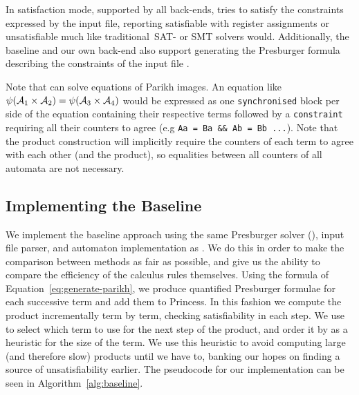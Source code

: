 \documentclass[acmsmall,review,anonymous]{acmart}\settopmatter{printfolios=true,printccs=false,printacmref=true}
\theoremstyle{definition}
\begin{document}
In satisfaction mode, supported by all back-ends, \Catra{} tries to satisfy the
constraints expressed by the input file, reporting satisfiable with register
assignments or unsatisfiable much like traditional~SAT- or SMT solvers would.
Additionally, the baseline and our own back-end also support generating
the Presburger formula describing the constraints of the input file .

Note that \Catra{} can solve equations of Parikh images. An equation like
$\operatorname{\psi}(\mathcal{A}_1 \times \mathcal{A}_2) = \operatorname{\psi}(\mathcal{A}_3 \times
\mathcal{A}_4)$ would be expressed as one \lstinline{synchronised} block per side of
the equation containing their respective terms followed by a
\lstinline{constraint} requiring all their counters to agree (e.g
\lstinline|Aa = Ba && Ab = Bb ...|). Note that the product construction will implicitly require the counters of each term to agree with each other (and the product), so equalities between all counters of all automata are not necessary.

\subsection{Implementing the Baseline}

We implement the baseline approach using the same Presburger solver
(\Princess{}), input file parser, and automaton implementation as \Catra{}. We
do this in order to make the comparison between methods as fair as possible, and
give us the ability to compare the efficiency of the calculus rules themselves.
Using the formula of Equation~\ref{eq:generate-parikh}, we produce quantified
Presburger formulae for each successive term and add them to Princess. In this
fashion we compute the product incrementally term by term, checking
satisfiability in each step. We use  to select which
term to use for the next step of the product, and order it by  as a heuristic for the size of the term. We use this heuristic
to avoid computing large (and therefore slow) products until we have to, banking
our hopes on finding a source of unsatisfiability earlier. The pseudocode for
our implementation can be seen in Algorithm~\ref{alg:baseline}.
\end{document}
